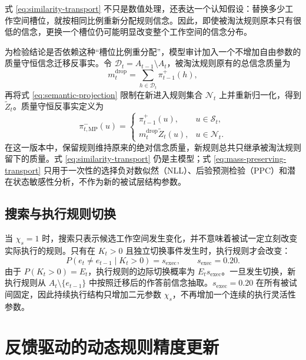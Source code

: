 \documentclass[12pt]{article}
\begin{document}
式 \eqref{eq:similarity-transport} 不只是数值处理，还表达一个认知假设：替换多少工作空间槽位，就按相同比例重新分配规则信念。因此，即使被淘汰规则原本只有很低的信念，更换一个槽位仍可能明显改变整个工作空间的信念分布。

为检验结论是否依赖这种“槽位比例重分配”，模型审计加入一个不增加自由参数的质量守恒信念迁移反事实。令 $\mathcal D_t=A_{t-1}\setminus A_t$，被淘汰规则原有的总信念质量为
\begin{equation}
m_t^{\mathrm{drop}}
=\sum_{h\in\mathcal D_t}\pi_{t-1}^{+}(h),
\label{eq:dropped-belief-mass}
\end{equation}
再将式 \eqref{eq:semantic-projection} 限制在新进入规则集合 $\mathcal N_t$ 上并重新归一化，得到 $\widetilde Z_t$。质量守恒反事实定义为
\begin{equation}
\pi_{t,\mathrm{MP}}^{-}(u)
=
\begin{cases}
\pi_{t-1}^{+}(u),&u\in\mathcal S_t,\\
m_t^{\mathrm{drop}}\widetilde Z_t(u),&u\in\mathcal N_t.
\end{cases}
\label{eq:mass-preserving-transport}
\end{equation}
在这一版本中，保留规则维持原来的绝对信念质量，新规则总共只继承被淘汰规则留下的质量。式 \eqref{eq:similarity-transport} 仍是主模型；式 \eqref{eq:mass-preserving-transport} 只用于一次性的选择负对数似然（NLL）、后验预测检验（PPC）和潜在状态敏感性分析，不作为新的被试层结构参数。

\subsection{搜索与执行规则切换}

当 $\chi_s=1$ 时，搜索只表示候选工作空间发生变化，并不意味着被试一定立刻改变实际执行的规则。只有在 $K_t>0$ 且独立切换事件发生时，执行规则才会改变：
\begin{equation}
P(e_t\neq e_{t-1}\mid K_t>0)=s_{\mathrm{exec}},
\qquad
s_{\mathrm{exec}}=0.20.
\label{eq:execution-switch}
\end{equation}
由于 $P(K_t>0)=E_t$，执行规则的边际切换概率为 $E_t s_{\mathrm{exec}}$。一旦发生切换，新执行规则从 $A_t\setminus\{e_{t-1}\}$ 中按照迁移后的作答前信念抽取。$s_{\mathrm{exec}}=0.20$ 在所有被试间固定，因此持续执行结构只增加二元参数 $\chi_s$，不再增加一个连续的执行灵活性参数。


\section{反馈驱动的动态规则精度更新}
\end{document}
